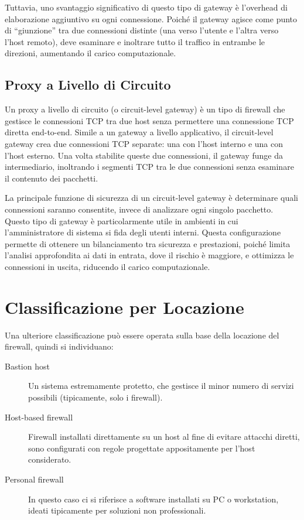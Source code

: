 Tuttavia, uno svantaggio significativo di questo tipo di gateway è l'overhead di elaborazione aggiuntivo su ogni connessione. Poiché il gateway agisce come punto di ``giunzione'' tra due connessioni distinte (una verso l'utente e l'altra verso l'host remoto), deve esaminare e inoltrare tutto il traffico in entrambe le direzioni, aumentando il carico computazionale.

\subsection{Proxy a Livello di Circuito}

Un proxy a livello di circuito (o circuit-level gateway) è un tipo di firewall che gestisce le connessioni TCP tra due host senza permettere una connessione TCP diretta end-to-end. Simile a un gateway a livello applicativo, il circuit-level gateway crea due connessioni TCP separate: una con l'host interno e una con l'host esterno. Una volta stabilite queste due connessioni, il gateway funge da intermediario, inoltrando i segmenti TCP tra le due connessioni senza esaminare il contenuto dei pacchetti.

La principale funzione di sicurezza di un circuit-level gateway è determinare quali connessioni saranno consentite, invece di analizzare ogni singolo pacchetto. Questo tipo di gateway è particolarmente utile in ambienti in cui l'amministratore di sistema si fida degli utenti interni. Questa configurazione permette di ottenere un bilanciamento tra sicurezza e prestazioni, poiché limita l'analisi approfondita ai dati in entrata, dove il rischio è maggiore, e ottimizza le connessioni in uscita, riducendo il carico computazionale.

\section{Classificazione per Locazione}

Una ulteriore classificazione può essere operata sulla base della locazione del firewall, quindi si individuano:

\begin{description}
    \item[Bastion host] Un sistema estremamente protetto, che gestisce il minor numero di servizi possibili (tipicamente, solo i firewall).
    
    \item[Host-based firewall] Firewall installati direttamente su un host al fine di evitare attacchi diretti, sono configurati con regole progettate appositamente per l'host considerato.
    
    \item[Personal firewall] In questo caso ci si riferisce a software installati su PC o workstation, ideati tipicamente per soluzioni non professionali.
\end{description}


